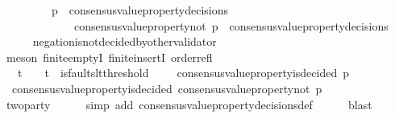 \begin{isabellebody}
\ \ \ \ \ \ \ \ {\isasymlongrightarrow}\ p\ {\isasymin}\ consensus{\isacharunderscore}value{\isacharunderscore}property{\isacharunderscore}decisions\ {\isasymsigma}{}\ \isanewline
\ \ \ \ \ \ \ \ \ \ \ \ {\isasymlongrightarrow}\ consensus{\isacharunderscore}value{\isacharunderscore}property{\isacharunderscore}not\ p\ {\isasymnotin}\ consensus{\isacharunderscore}value{\isacharunderscore}property{\isacharunderscore}decisions\ {\isasymsigma}{}{\isachardoublequoteclose}\isanewline
\ \ \ \ \isamarkupfalse%
\ negation{\isacharunderscore}is{\isacharunderscore}not{\isacharunderscore}decided{\isacharunderscore}by{\isacharunderscore}other{\isacharunderscore}validator\isanewline
\ \ \ \ \isamarkupfalse%
\ {\isacharparenleft}meson\ finite{\isachardot}emptyI\ finite{\isachardot}insertI\ order{\isacharunderscore}refl{\isacharparenright}\isanewline
\ \ \isamarkupfalse%
\ {\isachardoublequoteopen}{\isasymsigma}{}\ {\isasymin}\ {\isasymSigma}t\ {\isasymand}\ {\isasymsigma}{}\ {\isasymin}\ {\isasymSigma}t{\isachardoublequoteclose}\ \ {\isachardoublequoteopen}is{\isacharunderscore}faults{\isacharunderscore}lt{\isacharunderscore}threshold\ {\isacharparenleft}{\isasymsigma}{}\ {\isasymunion}\ {\isasymsigma}{}{\isacharparenright}{\isachardoublequoteclose}\ \ {\isachardoublequoteopen}consensus{\isacharunderscore}value{\isacharunderscore}property{\isacharunderscore}is{\isacharunderscore}decided\ {\isacharparenleft}p{\isacharcomma}\ {\isasymsigma}{}{\isacharparenright}{\isachardoublequoteclose}\isanewline
\ \ \isamarkupfalse%
\ \isamarkupfalse%
\ {\isachardoublequoteopen}{\isasymnot}\ consensus{\isacharunderscore}value{\isacharunderscore}property{\isacharunderscore}is{\isacharunderscore}decided\ {\isacharparenleft}consensus{\isacharunderscore}value{\isacharunderscore}property{\isacharunderscore}not\ p{\isacharcomma}\ {\isasymsigma}{}{\isacharparenright}{\isachardoublequoteclose}\ \ \isanewline
\ \ \ \ \isamarkupfalse%
\ two{\isacharunderscore}party\isanewline
\ \ \ \ \isamarkupfalse%
\ {\isacharparenleft}simp\ add{\isacharcolon}\ consensus{\isacharunderscore}value{\isacharunderscore}property{\isacharunderscore}decisions{\isacharunderscore}def{\isacharparenright}\isanewline
\ \ \ \ \isamarkupfalse%
\ blast\isanewline
{}\isamarkupfalse%
%
\endisatagproof
{\isafoldproof}%
%
\isadelimproof
\ \ \ \ \isanewline

\end{isabellebody}
